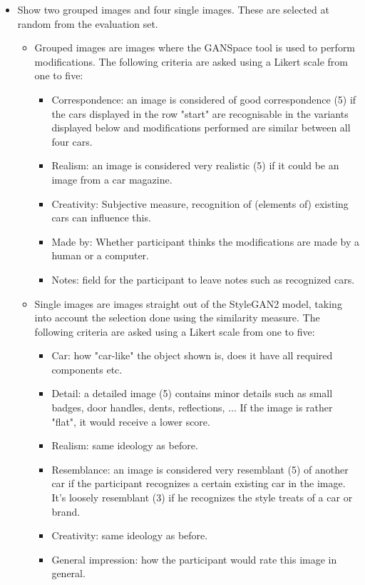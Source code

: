 \begin{itemize}
    \clearpage
    \item Show two grouped images and four single images. These are selected at random from the evaluation set.
    \begin{itemize}
        \item Grouped images are images where the GANSpace tool is used to perform modifications. The following criteria are asked using a Likert scale from one to five:
        \begin{itemize}
            \item Correspondence: an image is considered of good correspondence (5) if the cars displayed in the row "start" are recognisable in the variants displayed below and modifications performed are similar between all four cars.
            \item Realism: an image is considered very realistic (5) if it could be an image from a car magazine.
            \item Creativity: Subjective measure, recognition of (elements of) existing cars can influence this.
            \item Made by: Whether participant thinks the modifications are made by a human or a computer.
            \item Notes: field for the participant to leave notes such as recognized cars.
        \end{itemize}
        \item Single images are images straight out of the StyleGAN2 model, taking into account the selection done using the similarity measure. The following criteria are asked using a Likert scale from one to five:
        \begin{itemize}
            \item Car: how "car-like" the object shown is, does it have all required components etc.
            \item Detail: a detailed image (5) contains minor details such as small badges, door handles, dents, reflections, ... If the image is rather "flat", it would receive a lower score.
            \item Realism: same ideology as before.
            \item Resemblance: an image is considered very resemblant (5) of another car if the participant recognizes a certain existing car in the image. It's loosely resemblant (3) if he recognizes the style treats of a car or brand.
            \item Creativity: same ideology as before.
            \item General impression: how the participant would rate this image in general.

\end{itemize}
\end{itemize}
\end{itemize}

